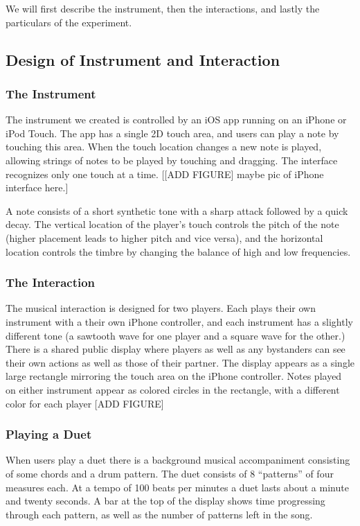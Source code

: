 \documentclass{article}
\begin{document}
We will first describe the instrument, then the interactions, and lastly the particulars of the experiment.


\subsection{Design of Instrument and Interaction}

\subsubsection{The Instrument}

The instrument we created is controlled by an iOS app running on an iPhone or iPod Touch. The app has a single 2D touch area, and users can play a note by touching this area. When the touch location changes a new note is played, allowing strings of notes to be played by touching and dragging.  The interface recognizes only one touch at a time. [[ADD FIGURE] maybe pic of iPhone interface here.]

A note consists of a short synthetic tone with a sharp attack followed by a quick decay.  The vertical location of the player’s touch controls the pitch of the note (higher placement leads to higher pitch and vice versa), and the horizontal location controls the timbre by changing the balance of high and low frequencies.

\subsubsection{The Interaction}

The musical interaction is designed for two players.  Each plays their own instrument with a their own iPhone controller, and each instrument has a slightly different tone (a sawtooth wave for one player and a square wave for the other.)  There is a shared public display where players as well as any bystanders can see their own actions as well as those of their partner.  The display appears as a single large rectangle mirroring the touch area on the iPhone controller.  Notes played on either instrument appear as colored circles in the rectangle, with a different color for each player [ADD FIGURE]

\subsubsection{Playing a Duet}

When users play a duet there is a background musical accompaniment consisting of some chords and a drum pattern.  The duet consists of 8 ``patterns'' of four measures each.  At a tempo of 100 beats per minutes a duet lasts about a minute and twenty seconds.  A bar at the top of the display shows time progressing through each pattern, as well as the number of patterns left in the song.  
\end{document}

